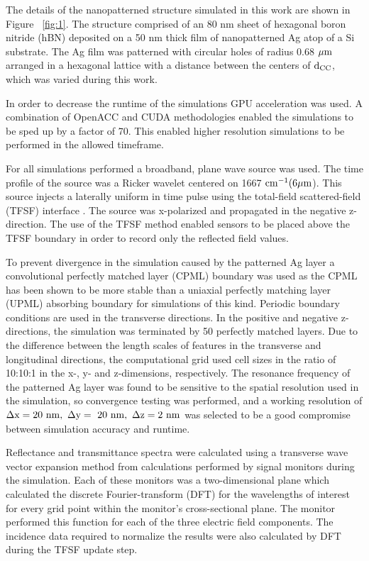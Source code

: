 \documentclass[
reprint,
amsmath,amssymb,
aip,
jap,
floatfix,
]{revtex4-2}
\begin{document}
    The details of the nanopatterned structure simulated in this work are shown in Figure ~\ref{fig:1}. The structure comprised of an 80 nm sheet of hexagonal boron nitride (hBN) deposited on a 50 nm thick film of nanopatterned Ag atop of a Si substrate. The Ag film was patterned with circular holes of radius 0.68 $\rm \mu m$ arranged in a hexagonal lattice with a distance between the centers of $\rm d_{CC}$, which was varied during this work.

    In order to decrease the runtime of the simulations GPU acceleration was used. A combination of OpenACC and CUDA \cite{PGI:20} methodologies enabled the simulations to be sped up by a factor of 70. This enabled higher resolution simulations to be performed in the allowed timeframe.

    For all simulations performed a broadband, plane wave source was used. The time profile of the source was a Ricker wavelet \cite{Ricker:43} centered on 1667 $\rm cm^{-1} (6  \mu m$). This source injects a laterally uniform in time pulse using the total-field scattered-field (TFSF) interface \cite{Merewether:80}. The source was x-polarized and propagated in the negative z-direction. The use of the TFSF method enabled sensors to be placed above the TFSF boundary in order to record only the reflected field values.
    
    To prevent divergence in the simulation caused by the patterned Ag layer a convolutional perfectly matched layer (CPML) \cite{Gvozdic:17} boundary was used as the CPML has been shown to be more stable than a uniaxial perfectly matching layer (UPML) \cite{Sacks:95} absorbing boundary for simulations of this kind. Periodic boundary conditions are used in the transverse directions. In the positive and negative z-directions, the simulation was terminated by 50 perfectly matched layers. Due to the difference between the length scales of features in the transverse and longitudinal directions, the computational grid used cell sizes in the ratio of 10:10:1 in the x-, y- and z-dimensions, respectively. The resonance frequency of the patterned Ag layer was found to be sensitive to the spatial resolution used in the simulation, so convergence testing was performed, and a working resolution of $\rm \Delta x = 20 \  nm, \ \Delta y = \ 20 \ nm, \ \Delta z = 2 \ nm$ was selected to be a good compromise between simulation accuracy and runtime.

    Reflectance and transmittance spectra were calculated using a transverse wave vector expansion method from calculations performed by signal monitors during the simulation. Each of these monitors was a two-dimensional plane which calculated the discrete Fourier-transform (DFT) for the wavelengths of interest for every grid point within the monitor’s cross-sectional plane. The monitor performed this function for each of the three electric field components. The incidence data required to normalize the results were also calculated by DFT during the TFSF update step.
\end{document}
